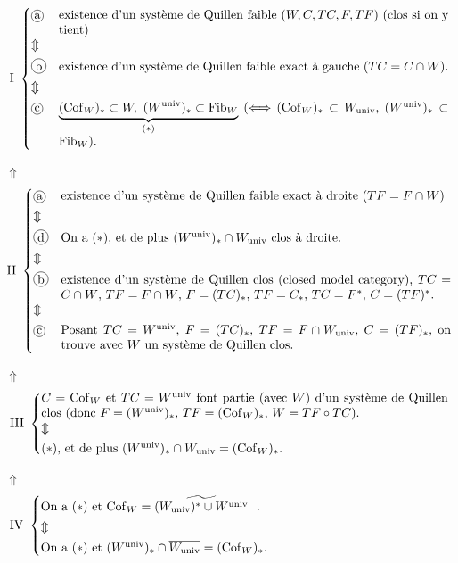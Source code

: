 \[
\mathrm{I}\ \left\{
\begin{array}{@{}l@{\quad}p{11cm}@{}}
\cercle{a} & existence d'un système de Quillen faible $(W, C, TC, F, TF)$ (clos si on y tient) \\[1ex]
\Updownarrow & \\[1ex]
\cercle{b} & existence d'un système de Quillen faible exact à gauche ($TC = C \cap W$). \\[1ex]
\Updownarrow & \\[1ex]
\cercle{c} & $\underbrace{(\Cof_W)_* \subset W,\ (W^{\univ})_* \subset \Fib_W}_{(*)}$ ($\Longleftrightarrow$ $(\Cof_W)_* \subset W_{\univ}$, $(W^{\univ})_* \subset \Fib_W$).
\end{array}\right.
\]

\noindent$\Uparrow$
\[
\mathrm{II}\ \left\{
\begin{array}{@{}l@{\quad}p{11cm}@{}}
\cercle{a} & existence d'un système de Quillen faible exact à droite ($TF = F \cap W$) \\[1ex]
\Updownarrow & \\[1ex]
\cercle{d} & On a $(*)$, et de plus $(W^{\univ})_* \cap W_{\univ}$ clos à droite. \\[1ex]
\Updownarrow & \\[1ex]
\cercle{b} & existence d'un système de Quillen clos (closed model category), $TC = C \cap W$, $TF = F \cap W$, $F = (TC)_*$, $TF = C_*$, $TC = F^*$, $C = (TF)^*$. \\[1ex]
\Updownarrow & \\[1ex]
\cercle{c} & Posant $TC = W^{\univ}$, $F = (TC)_*$, $TF = F \cap W_{\univ}$, $C = (TF)_*$, on trouve avec $W$ un système de Quillen clos. %
\end{array}\right.
\]

\noindent$\Uparrow$
\[
\mathrm{III}\ \left\{
\begin{array}{@{}p{11.5cm}@{}}
$C = \Cof_W$ et $TC = W^{\univ}$ font partie (avec $W$) d'un système de Quillen clos (donc $F = (W^{\univ})_*$, $TF = (\Cof_W)_*$, $W = TF \circ TC$). \\[1ex]
$\Updownarrow$ \\[1ex]
 $(*)$, et de plus $(W^{\univ})_* \cap W_{\univ} = (\Cof_W)_*$.
\end{array}\right.
\]

\noindent$\Uparrow$
\[
\mathrm{IV}\ \left\{
\begin{array}{@{}p{11.5cm}@{}}
On a $(*)$ et $\Cof_W = \widetilde{(W_{\univ})^* \cup W^{\univ}}$\ \ . \\[1ex]
$\Updownarrow$ \\[1ex]
On a $(*)$ et $(W^{\univ})_* \cap \overline{W_{\univ}} = (\Cof_W)_*$.
\end{array}\right.
\]

